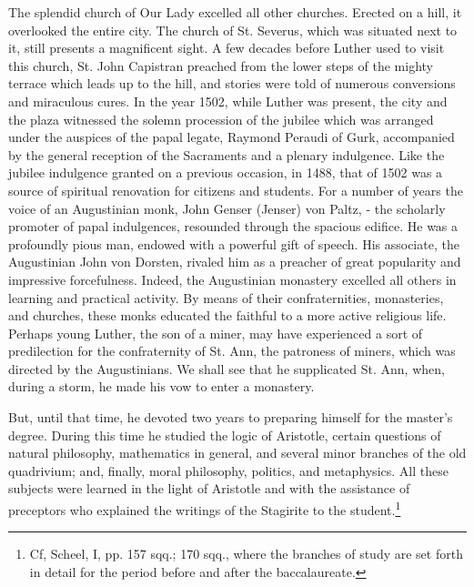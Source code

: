 The splendid church of Our Lady excelled all other churches.
Erected on a hill, it overlooked the entire city. The church of St.
Severus, which was situated next to it, still presents a magnificent
sight. A few decades before Luther used to visit this church, St. John
Capistran preached from the lower steps of the mighty terrace which
leads up to the hill, and stories were told of numerous conversions
and miraculous cures. In the year 1502, while Luther was present, the
city and the plaza witnessed the solemn procession of the jubilee
which was arranged under the auspices of the papal legate, Raymond
Peraudi of Gurk, accompanied by the general reception of the
Sacraments and a plenary indulgence. Like the jubilee indulgence
granted on a previous occasion, in 1488, that of 1502 was a source of
spiritual renovation for citizens and students. For a number of years
the voice of an Augustinian monk, John Genser (Jenser) von Paltz,
- the scholarly promoter of papal indulgences, resounded through the
spacious edifice. He was a profoundly pious man, endowed with
a powerful gift of speech. His associate, the Augustinian John von
Dorsten, rivaled him as a preacher of great popularity and impressive
forcefulness. Indeed, the Augustinian monastery excelled all others
in learning and practical activity. By means of their confraternities,
monasteries, and churches, these monks educated the faithful to a
more active religious life. Perhaps young Luther, the son of a miner,
may have experienced a sort of predilection for the confraternity of
St. Ann, the patroness of miners, which was directed by the Augustinians.
We shall see that he supplicated St. Ann, when, during a
storm, he made his vow to enter a monastery.

But, until that time, he devoted two years to preparing himself for
the master’s degree. During this time he studied the logic of Aristotle,
certain questions of natural philosophy, mathematics in general, and
several minor branches of the old quadrivium; and, finally, moral
philosophy, politics, and metaphysics. All these subjects were learned
in the light of Aristotle and with the assistance of preceptors who
explained the writings of the Stagirite to the student.\footnote{
Cf, Scheel, I, pp. 157 sqq.; 170 sqq., where the branches of study are set forth in
detail for the period before and after the baccalaureate.
}

